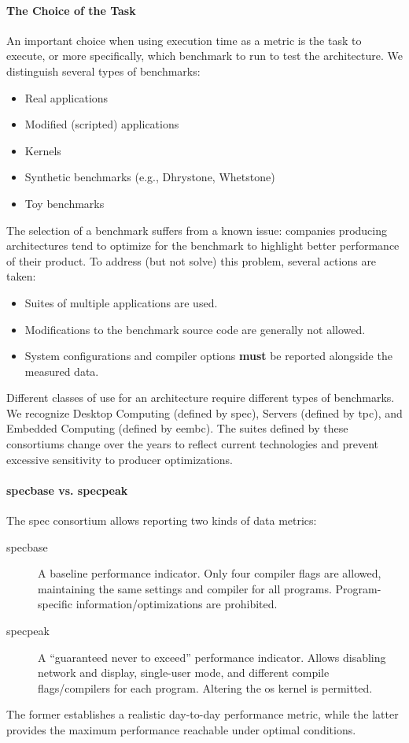 \paragraph{The Choice of the Task}
An important choice when using execution time as a metric is the task to execute, or more specifically, which benchmark to run to test the architecture. We distinguish several types of benchmarks:
\begin{itemize}
    \item Real applications
    \item Modified (scripted) applications
    \item Kernels
    \item Synthetic benchmarks (e.g., Dhrystone, Whetstone)
    \item Toy benchmarks
\end{itemize}
The selection of a benchmark suffers from a known issue: companies producing architectures tend to optimize for the benchmark to highlight better performance of their product. To address (but not solve) this problem, several actions are taken:
\begin{itemize}
    \item Suites of multiple applications are used.
    \item Modifications to the benchmark source code are generally not allowed.
    \item System configurations and compiler options \textbf{must} be reported alongside the measured data.
\end{itemize}
Different classes of use for an architecture require different types of benchmarks. We recognize Desktop Computing (defined by \gls{spec}), Servers (defined by \gls{tpc}), and Embedded Computing (defined by \gls{eembc}). The suites defined by these consortiums change over the years to reflect current technologies and prevent excessive sensitivity to producer optimizations. 

\paragraph{\gls{spec}base vs. \gls{spec}peak} 
The \gls{spec} consortium allows reporting two kinds of data metrics:
\begin{description}
    \item[\gls{spec}base] A baseline performance indicator. Only four compiler flags are allowed, maintaining the same settings and compiler for all programs. Program-specific information/optimizations are prohibited.
    \item[\gls{spec}peak] A ``guaranteed never to exceed'' performance indicator. Allows disabling network and display, single-user mode, and different compile flags/compilers for each program. Altering the \gls{os} kernel is permitted.
\end{description}
The former establishes a realistic day-to-day performance metric, while the latter provides the maximum performance reachable under optimal conditions.

